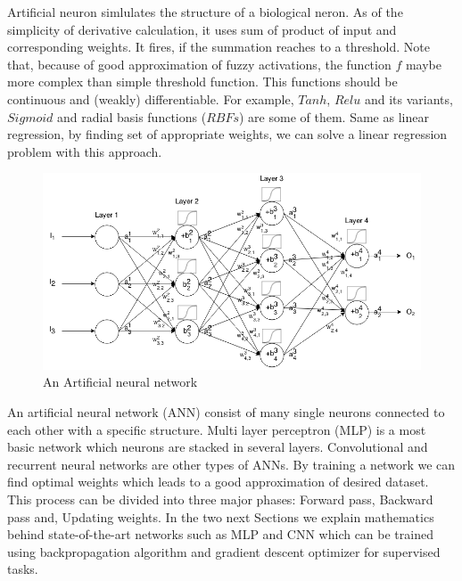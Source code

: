 \documentclass[10pt]{SelfArx} %
\begin{document}
%

Artificial neuron simlulates the structure of a biological neron. As of the simplicity of derivative calculation, it uses sum of product of input and corresponding weights. It fires, if the summation reaches to a threshold. Note that, because of good approximation of fuzzy activations, the function $f$ maybe more complex than simple threshold function. This functions should be continuous and (weakly) differentiable. For example, $Tanh$, $Relu$ and its variants, $Sigmoid$ and radial basis functions ($RBFs$) are some of them. Same as linear regression, by finding set of appropriate weights, we can solve a linear regression problem with this approach.

\begin{figure}\centering %
	\includegraphics[width=\linewidth]{img/ann}
	\caption{An Artificial neural network}	
\end{figure}

An artificial neural network (ANN) consist of many single neurons connected to each other with a specific structure. Multi layer perceptron (MLP) is a most basic network which neurons are stacked in several layers. Convolutional and recurrent neural networks are other types of ANNs. By training a network we can find optimal weights which leads to a good approximation of desired dataset. This process can be divided into three major phases:
Forward pass, Backward pass and, Updating weights. In the two next Sections we explain mathematics behind state-of-the-art networks such as MLP and CNN which can be trained using backpropagation algorithm and gradient descent optimizer for supervised tasks.
\end{document}
